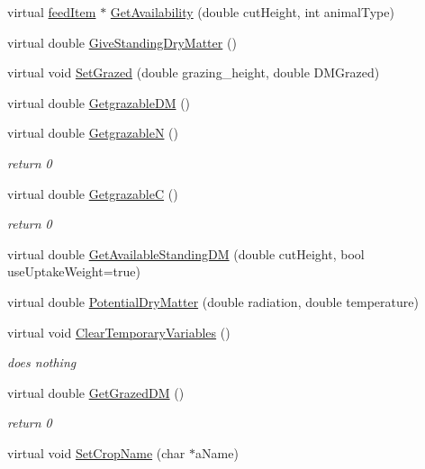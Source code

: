 \begin{DoxyCompactItemize}
\item 
virtual \hyperlink{classfeed_item}{feedItem} $\ast$ \hyperlink{classcrop_a066047061cd93c3ae3e798d66dc002fb}{GetAvailability} (double cutHeight, int animalType)
\item 
virtual double \hyperlink{classcrop_aebb32418775393941f24b066cd4ddec9}{GiveStandingDryMatter} ()
\item 
virtual void \hyperlink{classcrop_a29e704e7767db2f9270128fefc1a74c7}{SetGrazed} (double grazing\_\-height, double DMGrazed)
\item 
virtual double \hyperlink{classcrop_aed591b1785dede13c062ab0af439a902}{GetgrazableDM} ()
\item 
virtual double \hyperlink{classcrop_a771d3a2885d168f4f06686cc7868cad8}{GetgrazableN} ()
\begin{DoxyCompactList}\small\item\em return 0 \item\end{DoxyCompactList}\item 
virtual double \hyperlink{classcrop_ab856b98a56903245f5c0f0f173b74f35}{GetgrazableC} ()
\begin{DoxyCompactList}\small\item\em return 0 \item\end{DoxyCompactList}\item 
virtual double \hyperlink{classcrop_ac48847f64021da9cd0c2dac80d6b7849}{GetAvailableStandingDM} (double cutHeight, bool useUptakeWeight=true)
\item 
virtual double \hyperlink{classcrop_a0e9bb36caf25761c567dd2c59e3afccd}{PotentialDryMatter} (double radiation, double temperature)
\item 
virtual void \hyperlink{classcrop_ac113e2ac847afe0da1d72cad7faf4c5f}{ClearTemporaryVariables} ()
\begin{DoxyCompactList}\small\item\em does nothing \item\end{DoxyCompactList}\item 
virtual double \hyperlink{classcrop_a1aafdf75bbeabd5e961678d20b487976}{GetGrazedDM} ()
\begin{DoxyCompactList}\small\item\em return 0 \item\end{DoxyCompactList}\item 
virtual void \hyperlink{classcrop_a6ea34dbffd72c0178788d037db5d032e}{SetCropName} (char $\ast$aName)
\end{DoxyCompactItemize}
